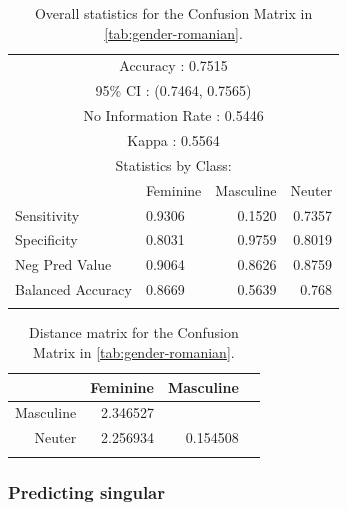 \begin{table}[!htpb]
  \centering
  \begin{tabular}{llrr}
    \lsptoprule
    \multicolumn{4}{c}{Overall statistics:} \\

    \midrule
    \multicolumn{4}{c}{Accuracy : 0.7515}                                  \\
    \multicolumn{4}{c}{95\% CI : (0.7464, 0.7565)}                         \\
    \multicolumn{4}{c}{No Information Rate : 0.5446}                       \\
    \multicolumn{4}{c}{Kappa : 0.5564}                                     \\
    \midrule
    \multicolumn{4}{c}{Statistics by Class:}                               \\
    \midrule
                      & Feminine & Masculine & Neuter \\
    Sensitivity       & 0.9306          & 0.1520           & 0.7357        \\
    Specificity       & 0.8031          & 0.9759           & 0.8019        \\
    Neg Pred Value    & 0.9064          & 0.8626           & 0.8759        \\
    Balanced Accuracy & 0.8669          & 0.5639           & 0.768         \\
    \lspbottomrule
  \end{tabular}
  \caption{Overall statistics for the Confusion Matrix in \ref{tab:gender-romanian}.}\label{tab:gender-romanian-stats}
\end{table}

\begin{table}[!htpb]
  \centering
  \begin{tabular}{rrrr}
    \lsptoprule
              & Feminine & Masculine \\
    \midrule
    Masculine & 2.346527 &           \\
    Neuter    & 2.256934 & 0.154508  \\
    \lspbottomrule
  \end{tabular}
  \caption{Distance matrix for the Confusion Matrix in \ref{tab:gender-romanian}.}\label{tab:gender-romanian-distance}
\end{table}

\subsubsection{Predicting singular}

